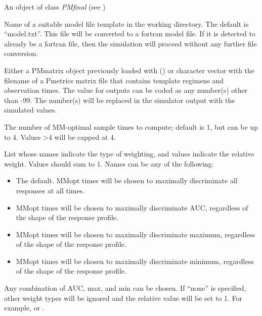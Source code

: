 \documentclass[a4paper]{book}
\begin{document}
\begin{Arguments}
\begin{ldescription}
\item[\code{poppar}] An object of class \emph{PMfinal} (see )

\item[\code{model}] Name of a suitable model file template in the working directory.
The default is ``model.txt''.  This file will be converted to a fortran model file.
If it is detected to already be a fortran file, then the simulation will proceed without any further
file conversion.

\item[\code{data}] Either a PMmatrix object previously loaded with () or character vector with the filename of a Pmetrics matrix file
that contains template regimens and observation times.  The value for outputs can be coded as
any number(s) other than -99.  The number(s) will be replaced in the simulator output with the simulated values.

\item[\code{nsamp}] The number of MM-optimal sample times to compute; default is 1, but can be up to 4.  Values >4 will be capped at 4.

\item[\code{weight}] List whose names indicate the type of weighting, and values indicate the
relative weight. Values should sum to 1.  Names can be any of the following:
\begin{itemize}

\item{}  The default. MMopt times will be chosen to maximally discriminate all responses at all times.
\item{}  MMopt times will be chosen to maximally discriminate AUC, regardless of the shape of the response profile. 
\item{}  MMopt times will be chosen to maximally discriminate maximum, regardless of the shape of the response profile.
\item{}  MMopt times will be chosen to maximally discriminate minimum, regardless of the shape of the response profile. 

\end{itemize}

Any combination of AUC, max, and min can be chosen.  If ``none'' is specified, other
weight types will be ignored and the relative value will be set to 1.
For example, or .


\end{ldescription}
\end{Arguments}
\end{document}
